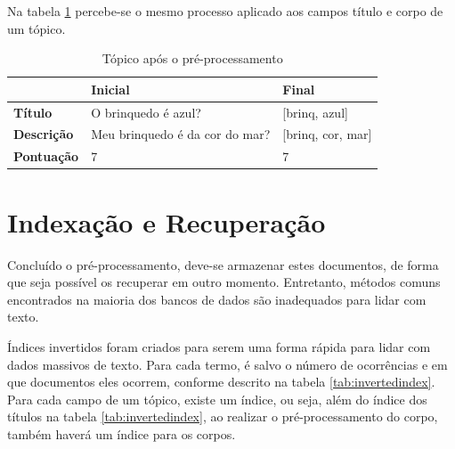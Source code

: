  Na tabela \ref{tab:quenstionpreprocessed} percebe-se o mesmo processo aplicado aos campos título e corpo de um tópico.

\begin{table}[htb]
	\centering
    \def\arraystretch{1.2} %
    \begin{tabular}{|l|l|l|}
        \hline
        & \textbf{Inicial} & \textbf{Final} \\ \hline
        \textbf{Título}              & O brinquedo é azul?            & [brinq, azul] \\ \hline
        \textbf{Descrição}               & Meu brinquedo é da cor do mar? & [brinq, cor, mar] \\ \hline
        \textbf{Pontuação}           & 7                              & 7 \\ \hline
    \end{tabular}
	\caption{Tópico após o pré-processamento}
    \label{tab:quenstionpreprocessed}
\end{table}     
\section{Indexação e Recuperação}
Concluído o pré-processamento, deve-se armazenar estes documentos, de forma que seja possível os recuperar em outro momento. Entretanto, métodos comuns encontrados na maioria dos bancos de dados são inadequados para lidar com texto.

Índices invertidos foram criados para serem uma forma rápida para lidar com dados massivos de texto. Para cada termo, é salvo o número de ocorrências e em que documentos eles ocorrem, conforme descrito na tabela \ref{tab:invertedindex}. Para cada campo de um tópico, existe um índice, ou seja, além do índice dos títulos na tabela \ref{tab:invertedindex}, ao realizar o pré-processamento do corpo, também haverá um índice para os corpos. 

